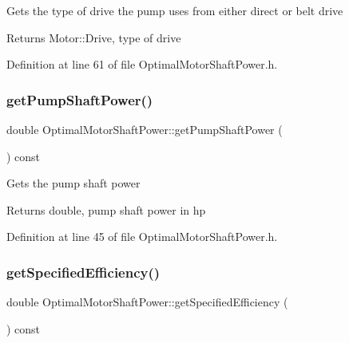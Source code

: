 Gets the type of drive the pump uses from either direct or belt drive \begin{DoxyReturn}{Returns}
Motor\+::\+Drive, type of drive 
\end{DoxyReturn}


Definition at line 61 of file Optimal\+Motor\+Shaft\+Power.\+h.

\mbox{\label{class_optimal_motor_shaft_power_aca7bb632c659ecf2ebf3cb9fdb23626f}} 
\subsubsection{\texorpdfstring{get\+Pump\+Shaft\+Power()}{getPumpShaftPower()}}
{\footnotesize\ttfamily double Optimal\+Motor\+Shaft\+Power\+::get\+Pump\+Shaft\+Power (\begin{DoxyParamCaption}{ }\end{DoxyParamCaption}) const\hspace{0.3cm}{\ttfamily [inline]}}

Gets the pump shaft power \begin{DoxyReturn}{Returns}
double, pump shaft power in hp 
\end{DoxyReturn}


Definition at line 45 of file Optimal\+Motor\+Shaft\+Power.\+h.

\mbox{\label{class_optimal_motor_shaft_power_a89c2038dae30ef58245e810187c2a6c4}} 
\subsubsection{\texorpdfstring{get\+Specified\+Efficiency()}{getSpecifiedEfficiency()}}
{\footnotesize\ttfamily double Optimal\+Motor\+Shaft\+Power\+::get\+Specified\+Efficiency (\begin{DoxyParamCaption}{ }\end{DoxyParamCaption}) const\hspace{0.3cm}{\ttfamily [inline]}}

